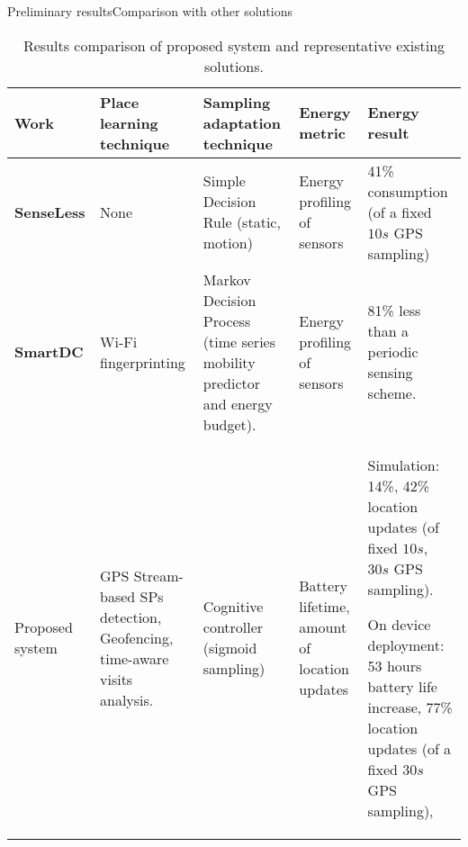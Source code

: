 \begin{frame}[noframenumbering]{Preliminary results}{Comparison with other solutions}
\begin{table}[]
\centering
\small
\tabcolsep=0.12cm
\renewcommand{\arraystretch}{1.2}
\begin{tabular}{@{}p{1cm}p{2cm}p{2.5cm}p{2cm}p{3cm}@{}}
\toprule
\textbf{Work} &
\textbf{Place learning technique} &
\textbf{Sampling adaptation technique} &
\textbf{Energy metric} &
\textbf{Energy result} \\ 
\midrule

\textbf{SenseLess} &
None &
Simple Decision Rule (static, motion) &
Energy profiling of sensors &
41\% consumption (of a fixed $10 s$ GPS sampling) \\

\cmidrule[0.25pt]{1-5}
\textbf{SmartDC} &
Wi-Fi fingerprinting &
Markov Decision Process (time series mobility predictor and energy budget). &
Energy profiling of sensors &
81\% less than a periodic sensing scheme.\\

\cmidrule[0.25pt]{1-5}
Proposed system &
GPS Stream-based SPs detection, Geofencing, time-aware visits analysis. &
Cognitive controller (sigmoid sampling) &
Battery lifetime, amount of location updates &
{
Simulation: 14\%, 42\% location updates (of fixed $10 s$, $30 s$ GPS sampling).

On device deployment: 53 hours battery life increase, 77\% location updates (of a fixed $30 s$ GPS sampling), 
}\\

\bottomrule
\end{tabular}

\caption{Results comparison of proposed system and representative existing solutions.}
\end{table}
\end{frame}
